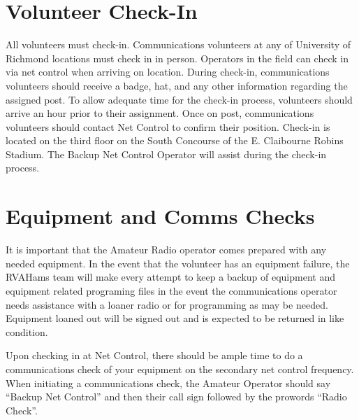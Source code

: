 \documentclass[pdflatex,letterpaper,twoside,12pt]{book}
\begin{document}

\section{Volunteer Check-In}

All volunteers must check-in.  Communications volunteers at any of University of Richmond locations must check in in person.  Operators in the field can check in via net control when arriving on location.  During check-in, communications volunteers should receive a badge, hat, and any other information regarding the assigned post.  To allow adequate time for the check-in process, volunteers should arrive an hour prior to their assignment.  Once on post, communications volunteers should contact Net Control to confirm their position.  Check-in is located on the third floor on the South Concourse of the E. Claibourne Robins Stadium.  The Backup Net Control Operator will assist during the check-in process.


\section{Equipment and Comms Checks}

It is important that the Amateur Radio operator comes prepared with any needed equipment.  In the event that the volunteer has an equipment failure, the RVAHams team will make every attempt to keep a backup of equipment and equipment related programing files in the event the communications operator needs assistance with a loaner radio or for programming as may be needed.  Equipment loaned out will be signed out and is expected to be returned in like condition.

Upon checking in at Net Control, there should be ample time to do a communications check of your equipment on the secondary net control frequency.  When initiating a communications check, the Amateur Operator should say “Backup Net Control” and then their call sign followed by the prowords “Radio Check”.

\end{document}
